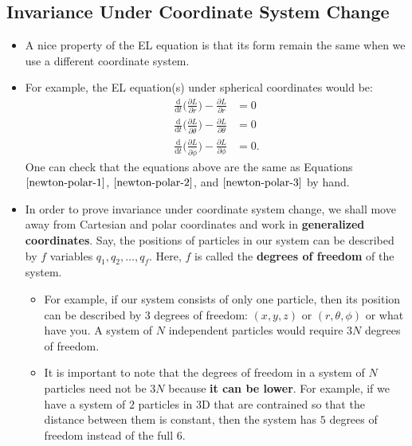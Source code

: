 \documentclass[10pt]{article}
\newcommand{\dee}{\mathrm{d}}
\begin{document}
  \subsection{Invariance Under Coordinate System Change}

  \begin{itemize}
  	\item A nice property of the EL equation is that its form remain the same when we use a different coordinate system.

  	\item For example, the EL equation(s) under spherical coordinates would be:
  	\begin{align*}
  		\frac{\dee}{\dee t} \bigg( \frac{\partial L}{\partial \dot{r}} \bigg) - \frac{\partial L}{\partial r} &= 0 \\
  		\frac{\dee}{\dee t} \bigg( \frac{\partial L}{\partial \dot{\theta}} \bigg) - \frac{\partial L}{\partial \theta} &= 0 \\
  		\frac{\dee}{\dee t} \bigg( \frac{\partial L}{\partial \dot{\phi}} \bigg) - \frac{\partial L}{\partial \phi} &= 0.
  	\end{align*}
  	One can check that the equations above are the same as Equations $\eqref{newton-polar-1}$, $\eqref{newton-polar-2}$, and $\eqref{newton-polar-3}$ by hand.

  	\item In order to prove invariance under coordinate system change, we shall move away from Cartesian and polar coordinates and work in {\bf generalized coordinates}. Say, the positions of particles in our system can be described by $f$ variables $q_1, q_2, \dotsc, q_f$. Here, $f$ is called the {\bf degrees of freedom} of the system.
  	\begin{itemize}
  		\item For example, if our system consists of only one particle, then its position can be described by 3 degrees of freedom: $(x,y,z)$ or $(r,\theta,\phi)$ or what have you. A system of $N$ independent particles would require $3N$ degrees of freedom.

  		\item It is important to note that the degrees of freedom in a system of $N$ particles need not be $3N$ because {\bf it can be lower}. For example, if we have a system of $2$ particles in 3D that are contrained so that the distance between them is constant, then the system has $5$ degrees of freedom instead of the full $6$.
  	\end{itemize}


\end{itemize}
\end{document}
